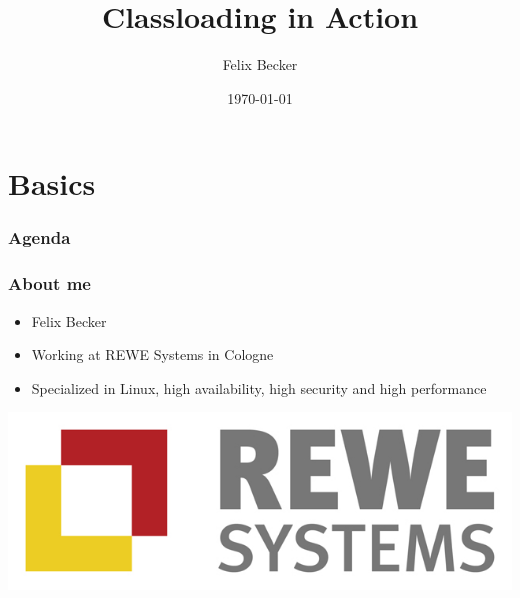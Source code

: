 \documentclass[aspectratio=169]{beamer}
\title{Classloading in Action}
\author{Felix Becker}
\date{\today}
\institute{JAX 2019}
\begin{document}
\maketitle


\section{Basics}

\begin{frame}
	\frametitle{Agenda}
	\tableofcontents
\end{frame}

\begin{frame}
	\frametitle{About me}
		\begin{minipage}[t]{0.48\linewidth}
		\begin{itemize}
		\item{Felix Becker}
		\item{Working at REWE Systems in Cologne}
		\item{Specialized in Linux, high availability, high security and high performance}
		\end{itemize}
		\end{minipage}
		\hfill
		\begin{minipage}[t]{0.48\linewidth}
		\includegraphics[scale=0.2]{assets/rewesyslogo.jpg}
	\end{minipage}
\end{frame}
\end{document}
